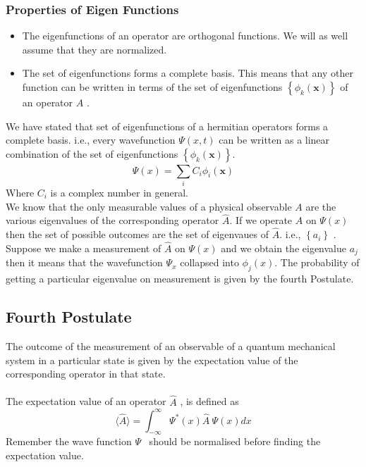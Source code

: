\subsubsection{Properties of Eigen Functions}
\begin{itemize}
	\item  The eigenfunctions of an operator are orthogonal functions. We will as well assume that they are normalized. 
	\item The set of eigenfunctions forms a complete basis. This means that any other function can be written in terms of the set of eigenfunctions $\left\{\phi_{k}(\mathbf{x})\right\}$ of an operator $A$ .
\end{itemize}
We have stated that set of eigenfunctions of a hermitian operators forms a complete basis. i.e., every wavefunction $\Psi(x,t)$ can be written as a linear combination of the set of eigenfunctions $\left\{\phi_{k}(\mathbf{x})\right\}$.
\begin{equation}
\Psi(x)=\sum_{i}^{}{C_{i}\phi_{i}(\mathbf{x})}
\end{equation}
Where $C_{i}$ is a complex number in general.\\
We know that the only measurable values of a physical observable ${A}$ are the various eigenvalues of the corresponding operator $\hat{{A}}$. If we operate $\hat{A}$ on $\Psi(x)$ then the set of possible outcomes are the set of eigenvaues of $\hat{{A}}$. i.e., $\left\{a_{i}\right\}$ . Suppose we make a measurement of $\hat{{A}}$ on $\Psi(x)$ and we obtain the eigenvalue $a_{j}$ then it means that the wavefunction $\Psi_{x}$ collapsed into $\phi_{j}(x)$. The probability of getting a particular eigenvalue on measurement is given by the fourth Postulate.
\subsection{Fourth Postulate}
The outcome of the measurement of an observable of a quantum mechanical system in a particular state is given by the expectation value of the corresponding operator in that state.
\\\\The expectation value  of an operator $\hat{A}$ , is defined as\\
\begin{equation}
\langle \hat{A} \rangle = \int_{-\infty}^{\infty} \Psi^{*}(x) \hat{A}\  \Psi(x) dx
\end{equation}
Remember the  wave function $\Psi $ \ should be normalised before finding the expectation value.
